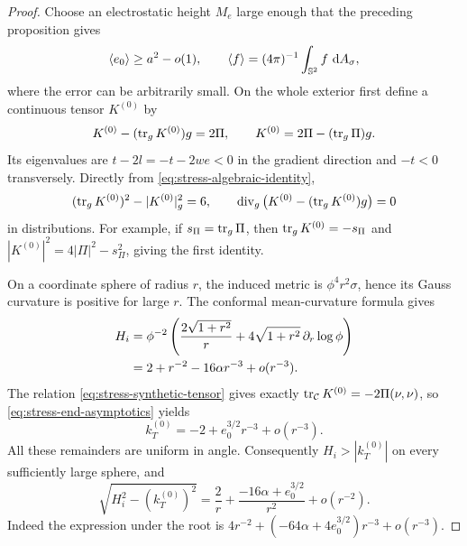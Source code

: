 \begin{proof}
Choose an electrostatic height $M_e$ large enough that the preceding
proposition gives
\begin{equation}
 \langle e_0\rangle\ge a^2-o(1),\qquad
 \langle f\rangle=(4\pi)^{-1}\int_{\mathbb S^2}f\,\mathop{}\!\mathrm d A_\sigma,
 \label{eq:stress-charge-average}
\end{equation}
where the error can be arbitrarily small.  On the whole exterior
first define a continuous tensor $K^{(0)}$ by
\begin{equation}
 K^{(0)}-(\operatorname{tr}_gK^{(0)})g=2\Pi,
 \qquad K^{(0)}=2\Pi-(\operatorname{tr}_g\Pi)g.
 \label{eq:stress-synthetic-tensor}
\end{equation}
Its eigenvalues are $t-2l=-t-2we<0$ in the gradient direction and
$-t<0$ transversely.  Directly from
\eqref{eq:stress-algebraic-identity},
\begin{equation}
 (\operatorname{tr}_gK^{(0)})^2-|K^{(0)}|_g^2=6,
 \qquad
 \operatorname{div}_g\big(K^{(0)}-(\operatorname{tr}_gK^{(0)})g\big)=0
 \label{eq:stress-synthetic-identities}
\end{equation}
in distributions.  For example, if $s_\Pi=\operatorname{tr}_g\Pi$, then
$\operatorname{tr}_gK^{(0)}=-s_\Pi$ and
$|K^{(0)}|^2=4|\Pi|^2-s_\Pi^2$, giving the first identity.

On a coordinate sphere of radius $r$, the induced metric is
$\phi^4r^2\sigma$, hence its Gauss curvature is positive for large
$r$.  The conformal mean-curvature formula gives
\begin{align}
 H_i
 &=\phi^{-2}\left(\frac{2\sqrt{1+r^2}}r
       +4\sqrt{1+r^2}\,\partial_r\log\phi\right)\notag\\
 &=2+r^{-2}-16\alpha r^{-3}+o(r^{-3}).
 \label{eq:stress-inner-H-expansion}
\end{align}
The relation \eqref{eq:stress-synthetic-tensor} gives exactly
$\operatorname{tr}_{\mathcal C}K^{(0)}=-2\Pi(\nu,\nu)$, so
\eqref{eq:stress-end-asymptotics} yields
\begin{equation}
 k_T^{(0)}=-2+e_0^{3/2}r^{-3}+o(r^{-3}).
 \label{eq:stress-tangential-K-expansion}
\end{equation}
All these remainders are uniform in angle.  Consequently
$H_i>|k_T^{(0)}|$ on every sufficiently large sphere, and
\begin{equation}
 \sqrt{H_i^2-(k_T^{(0)})^2}
 =\frac2r+\frac{-16\alpha+e_0^{3/2}}{r^2}+o(r^{-2}).
 \label{eq:stress-outer-H-expansion}
\end{equation}
Indeed the expression under the root is
$4r^{-2}+(-64\alpha+4e_0^{3/2})r^{-3}+o(r^{-3})$.


\end{proof}
